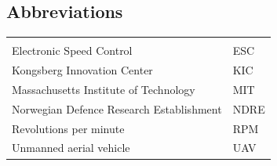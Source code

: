 \documentclass{article}
\begin{document}
\vspace*{2.0 cm}

\begin{center}
\section*{\textbf{Abbreviations}}
\begin{tabular}{ll}
\rowcolor{cadetgrey}
    &   \\
Electronic Speed Control      & ESC          \\\rowcolor{gainsboro}
Kongsberg Innovation Center & KIC \\
Massachusetts Institute of Technology       & MIT
\\\rowcolor{gainsboro}
Norwegian Defence Research Establishment   & NDRE \\
Revolutions per minute      & RPM         
\\\rowcolor{gainsboro}
Unmanned aerial vehicle     & UAV   \\
\end{tabular}                                                             
\end{center}
\newpage


%




\newpage


\newpage


\newpage


%
\end{document}
